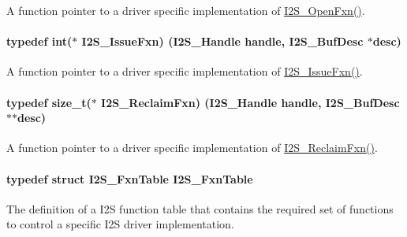 A function pointer to a driver specific implementation of \hyperlink{_i2_s_8h_a0a8c4787b4a5a262dc86d9dfa7da2840}{I2\+S\+\_\+\+Open\+Fxn()}. 

\paragraph[{I2\+S\+\_\+\+Issue\+Fxn}]{\setlength{\rightskip}{0pt plus 5cm}typedef int($\ast$ I2\+S\+\_\+\+Issue\+Fxn) ({\bf I2\+S\+\_\+\+Handle} handle, {\bf I2\+S\+\_\+\+Buf\+Desc} $\ast$desc)}\label{_i2_s_8h_a29e133c66e4e69905690c63157ca662d}


A function pointer to a driver specific implementation of \hyperlink{_i2_s_8h_a29e133c66e4e69905690c63157ca662d}{I2\+S\+\_\+\+Issue\+Fxn()}. 

\paragraph[{I2\+S\+\_\+\+Reclaim\+Fxn}]{\setlength{\rightskip}{0pt plus 5cm}typedef size\+\_\+t($\ast$ I2\+S\+\_\+\+Reclaim\+Fxn) ({\bf I2\+S\+\_\+\+Handle} handle, {\bf I2\+S\+\_\+\+Buf\+Desc} $\ast$$\ast$desc)}\label{_i2_s_8h_aeb85638443d9071ae1e46233cb7ed82c}


A function pointer to a driver specific implementation of \hyperlink{_i2_s_8h_aeb85638443d9071ae1e46233cb7ed82c}{I2\+S\+\_\+\+Reclaim\+Fxn()}. 

\paragraph[{I2\+S\+\_\+\+Fxn\+Table}]{\setlength{\rightskip}{0pt plus 5cm}typedef struct {\bf I2\+S\+\_\+\+Fxn\+Table}  {\bf I2\+S\+\_\+\+Fxn\+Table}}\label{_i2_s_8h_aea46bf5e1dc3bfd520ba7d2911b15b8c}


The definition of a I2\+S function table that contains the required set of functions to control a specific I2\+S driver implementation. 

